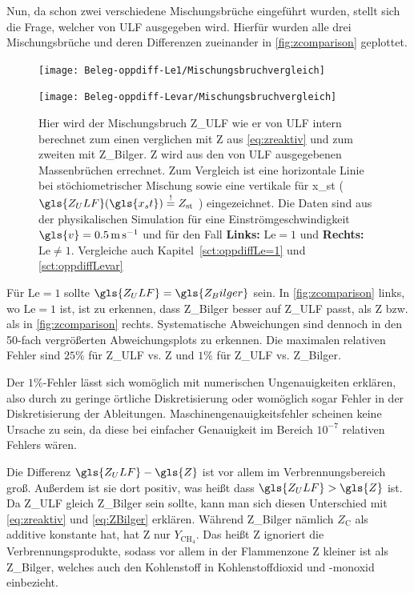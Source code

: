 Nun, da schon zwei verschiedene Mischungsbrüche eingeführt wurden, stellt sich die Frage, welcher von \gls{ULF} ausgegeben wird. Hierfür wurden alle drei Mischungsbrüche und deren Differenzen zueinander in \autoref{fig:zcomparison} geplottet.

\begin{figure}[H]
    \begin{center}\begin{minipage}{0.5\linewidth}
        \texttt{[image: Beleg-oppdiff-Le1/Mischungsbruchvergleich]}
    \end{minipage}\begin{minipage}{0.5\linewidth}
        \texttt{[image: Beleg-oppdiff-Levar/Mischungsbruchvergleich]}
    \end{minipage}\end{center}
    \caption{Hier wird der Mischungsbruch \gls{Z_ULF} wie er von \gls{ULF} intern berechnet zum einen verglichen mit \gls{Z} aus \autoref{eq:zreaktiv} und zum zweiten mit \gls{Z_Bilger}. \gls{Z} wird aus den von \gls{ULF} ausgegebenen Massenbrüchen errechnet. Zum Vergleich ist eine horizontale Linie bei stöchiometrischer Mischung sowie eine vertikale für \gls{x_st} ( $\gls{Z_ULF}( \gls{x_st} ) \overset{!}{=} Z_\mathrm{st}$ ) eingezeichnet. Die Daten sind aus der physikalischen Simulation für eine Einströmgeschwindigkeit $\gls{v}=\SI{0.5}{\meter\per\second}$ und für den Fall \textbf{Links:} $\mathrm{Le}=1$ und \textbf{Rechts:} $\mathrm{Le}\neq 1$. Vergleiche auch Kapitel~\ref{sct:oppdiffLe=1} und \ref{sct:oppdiffLevar}}
    \label{fig:zcomparison}
\end{figure}

Für $\mathrm{Le}=1$ sollte $\gls{Z_ULF} = \gls{Z_Bilger}$ sein. In \autoref{fig:zcomparison} links, wo $\mathrm{Le}=1$ ist, ist zu erkennen, dass \gls{Z_Bilger} besser auf \gls{Z_ULF} passt, als \gls{Z} bzw. als in \autoref{fig:zcomparison} rechts. Systematische Abweichungen sind dennoch in den 50-fach vergrößerten Abweichungsplots zu erkennen. Die maximalen relativen Fehler sind $25\%$ für \gls{Z_ULF} vs. \gls{Z} und $1\%$ für \gls{Z_ULF} vs. \gls{Z_Bilger}.

Der $1\%$-Fehler lässt sich womöglich mit numerischen Ungenauigkeiten erklären, also durch zu geringe örtliche Diskretisierung oder womöglich sogar Fehler in der Diskretisierung der Ableitungen. Maschinengenauigkeitsfehler scheinen keine Ursache zu sein, da diese bei einfacher Genauigkeit im Bereich $10^{-7}$ relativen Fehlers wären.

Die Differenz $\gls{Z_ULF} - \gls{Z}$ ist vor allem im Verbrennungsbereich groß. Außerdem ist sie dort positiv, was heißt dass $\gls{Z_ULF} > \gls{Z}$ ist. Da \gls{Z_ULF} gleich \gls{Z_Bilger} sein sollte, kann man sich diesen Unterschied mit \autoref{eq:zreaktiv} und \autoref{eq:ZBilger} erklären. Während \gls{Z_Bilger} nämlich $Z_\mathrm{C}$ als additive konstante hat, hat \gls{Z} nur $Y_{\mathrm{CH}_4}$. Das heißt \gls{Z} ignoriert die Verbrennungsprodukte, sodass vor allem in der Flammenzone \gls{Z} kleiner ist als \gls{Z_Bilger}, welches auch den Kohlenstoff in Kohlenstoffdioxid und -monoxid einbezieht.



